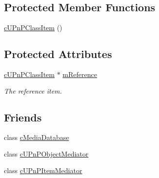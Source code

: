 \subsection*{Protected Member Functions}
\begin{CompactItemize}
\item 
\hyperlink{classcUPnPClassItem_c7d477be76ca83891c990441b539935d}{cUPnPClassItem} ()
\end{CompactItemize}
\subsection*{Protected Attributes}
\begin{CompactItemize}
\item 
\hypertarget{classcUPnPClassItem_86a22ee98384003e3c09c43f15b3a58a}{
\hyperlink{classcUPnPClassItem}{cUPnPClassItem} $\ast$ \hyperlink{classcUPnPClassItem_86a22ee98384003e3c09c43f15b3a58a}{mReference}}
\label{classcUPnPClassItem_86a22ee98384003e3c09c43f15b3a58a}

\begin{CompactList}\small\item\em The reference item. \item\end{CompactList}\end{CompactItemize}
\subsection*{Friends}
\begin{CompactItemize}
\item 
\hypertarget{classcUPnPClassItem_3d0d0aedce8b1c661ea360b9a6d616f6}{
class \hyperlink{classcUPnPClassItem_3d0d0aedce8b1c661ea360b9a6d616f6}{cMediaDatabase}}
\label{classcUPnPClassItem_3d0d0aedce8b1c661ea360b9a6d616f6}

\item 
\hypertarget{classcUPnPClassItem_aefab39434a832c545ac75a79fa81d23}{
class \hyperlink{classcUPnPClassItem_aefab39434a832c545ac75a79fa81d23}{cUPnPObjectMediator}}
\label{classcUPnPClassItem_aefab39434a832c545ac75a79fa81d23}

\item 
\hypertarget{classcUPnPClassItem_9b56ac88275693464968ee30d903286a}{
class \hyperlink{classcUPnPClassItem_9b56ac88275693464968ee30d903286a}{cUPnPItemMediator}}
\label{classcUPnPClassItem_9b56ac88275693464968ee30d903286a}

\end{CompactItemize}


